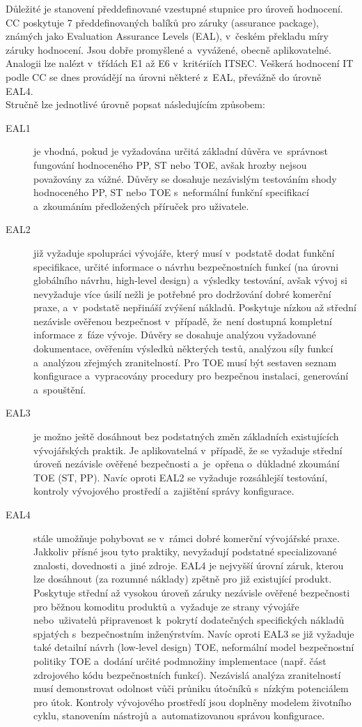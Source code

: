 \documentclass[a4paper,12pt]{article}
\begin{document}
Důležité je stanovení předdefinované vzestupné stupnice pro úroveň hodnocení. CC poskytuje 7 předdefinovaných balíků pro záruky (assurance package), známých jako Evaluation Assurance Levels (EAL), v~českém překladu míry záruky hodnocení. Jsou dobře promyšlené a~vyvážené, obecně aplikovatelné. Analogii lze nalézt v~třídách E1 až E6 v~kritériích ITSEC. Veškerá hodnocení IT podle CC se dnes provádějí na úrovni některé z~EAL, převážně do úrovně EAL4.~\cite{NBUHodnoceniBezpecnostiSW}\\

Stručně lze jednotlivé úrovně popsat následujícím způsobem:
\begin{description}
 \item[EAL1] je vhodná, pokud je vyžadována určitá základní důvěra ve~správnost fungování hodnoceného PP, ST nebo TOE, avšak hrozby nejsou považovány za vážné. Důvěry se dosahuje nezávislým testováním shody hodnoceného PP, ST nebo TOE s~neformální funkční specifikací a~zkoumáním předložených příruček pro uživatele.~\cite{NBUHodnoceniBezpecnostiSW}
 \item[EAL2] již vyžaduje spolupráci vývojáře, který musí v~podstatě dodat funkční specifikace, určité informace o návrhu bezpečnostních funkcí (na úrovni globálního návrhu, high-level design) a~výsledky testování, avšak vývoj si nevyžaduje více úsilí nežli je potřebné pro dodržování dobré komerční praxe, a~v~podstatě nepřináší zvýšení nákladů. Poskytuje nízkou až střední nezávisle ověřenou bezpečnost v~případě, že~není dostupná kompletní informace z~fáze vývoje. Důvěry se dosahuje analýzou vyžadované dokumentace, ověřením výsledků některých testů, analýzou síly funkcí a~analýzou zřejmých zranitelností. Pro TOE musí být sestaven seznam konfigurace a~vypracovány procedury pro bezpečnou instalaci, generování a~spouštění.~\cite{NBUHodnoceniBezpecnostiSW}
 \item[EAL3] je možno ještě dosáhnout bez podstatných změn základních existujících vývojářských praktik. Je aplikovatelná v~případě, že se vyžaduje střední úroveň nezávisle ověřené bezpečnosti a~je~opřena o~důkladné zkoumání TOE (ST, PP). Navíc oproti EAL2 se vyžaduje rozsáhlejší testování, kontroly vývojového prostředí a~zajištění správy konfigurace.~\cite{NBUHodnoceniBezpecnostiSW}
 \item[EAL4] stále umožňuje pohybovat se v~rámci dobré komerční vývojářské praxe. Jakkoliv přísné jsou tyto praktiky, nevyžadují podstatné specializované znalosti, dovednosti a~jiné zdroje. EAL4 je nejvyšší úrovní záruk, kterou lze dosáhnout (za rozumné náklady) zpětně pro již existující produkt. Poskytuje střední až vysokou úroveň záruky nezávisle ověřené bezpečnosti pro běžnou komoditu produktů a~vyžaduje ze strany vývojáře nebo~uživatelů připravenost k~pokrytí dodatečných specifických nákladů spjatých s~bezpečnostním inženýrstvím. Navíc oproti EAL3 se již vyžaduje také detailní návrh (low-level design) TOE, neformální model bezpečnostní politiky TOE a~dodání určité podmnožiny implementace (např. část zdrojového kódu bezpečnostních funkcí). Nezávislá analýza zranitelností musí demonstrovat odolnost vůči průniku útočníků s~nízkým potenciálem pro útok. Kontroly vývojového prostředí jsou doplněny modelem životního cyklu, stanovením nástrojů a~automatizovanou správou konfigurace.~\cite{NBUHodnoceniBezpecnostiSW}

\end{description}
\end{document}
